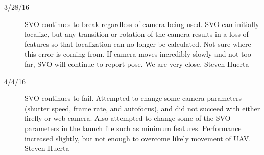 \begin{description}
\item [3/28/16]  SVO continues to break regardless of camera being used. SVO can initially localize, but any transition or rotation of the camera results in a loss of features so that localization can no longer be calculated. Not sure where this error is coming from. If camera moves incredibly slowly and not too far, SVO will continue to report pose. We are very close.  \hfill{Steven Huerta}


\item [4/4/16] SVO continues to fail. Attempted to change some camera parameters (shutter speed, frame rate, and autofocus), and did not succeed with either firefly or web camera. Also attempted to change some of the SVO parameters in the launch file such as minimum features. Performance increased slightly, but not enough to overcome likely movement of UAV.  \hfill{Steven Huerta}
\end{description}